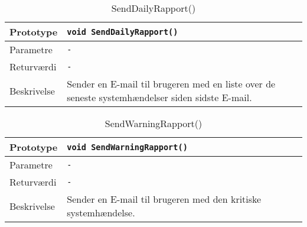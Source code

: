 \begin{table}[h]
\begin{tabularx}{\textwidth}{| L{2.5 cm} | Z |} \hline
Prototype & \texttt{void SendDailyRapport()} \\\hline
Parametre & \texttt{-} \\\hline
Returværdi & \texttt{-} \\\hline
Beskrivelse & Sender en E-mail til brugeren med en liste over de seneste systemhændelser siden sidste E-mail.
 \\\hline
\end{tabularx}
\caption{SendDailyRapport()}
\label{table:Rapport_SendDailyRapport}
\end{table}

\begin{table}[h]
\begin{tabularx}{\textwidth}{| L{2.5 cm} | Z |} \hline
Prototype & \texttt{void SendWarningRapport()} \\\hline
Parametre & \texttt{-} \\\hline
Returværdi & \texttt{-} \\\hline
Beskrivelse & Sender en E-mail til brugeren med den kritiske systemhændelse. 
 \\\hline
\end{tabularx}
\caption{SendWarningRapport()}
\label{table:Rapport_SendWarningRapport}
\end{table}

